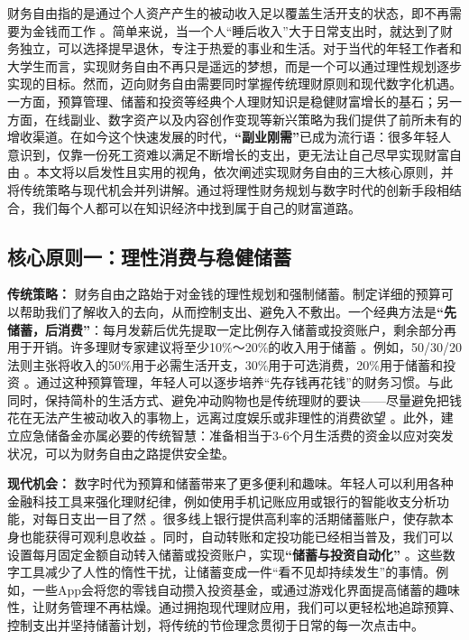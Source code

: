 \documentclass[
  12pt]{article}
\begin{document}
财务自由指的是通过个人资产产生的被动收入足以覆盖生活开支的状态，即不再需要为金钱而工作
\cite{ref1}。简单来说，当一个人``睡后收入''大于日常支出时，就达到了财务独立，可以选择提早退休，专注于热爱的事业和生活。对于当代的年轻工作者和大学生而言，实现财务自由不再只是遥远的梦想，而是一个可以通过理性规划逐步实现的目标。然而，迈向财务自由需要同时掌握传统理财原则和现代数字化机遇。一方面，预算管理、储蓄和投资等经典个人理财知识是稳健财富增长的基石；另一方面，在线副业、数字资产以及内容创作变现等新兴策略为我们提供了前所未有的增收渠道。在如今这个快速发展的时代，\textbf{``副业刚需''}已成为流行语：很多年轻人意识到，仅靠一份死工资难以满足不断增长的支出，更无法让自己尽早实现财富自由
\cite{ref2}。本文将以启发性且实用的视角，依次阐述实现财务自由的三大核心原则，并将传统策略与现代机会并列讲解。通过将理性财务规划与数字时代的创新手段相结合，我们每个人都可以在知识经济中找到属于自己的财富道路。

\hypertarget{ux6838ux5fc3ux539fux5219ux4e00ux7406ux6027ux6d88ux8d39ux4e0eux7a33ux5065ux50a8ux84c4}{%
\subsection{核心原则一：理性消费与稳健储蓄}\label{ux6838ux5fc3ux539fux5219ux4e00ux7406ux6027ux6d88ux8d39ux4e0eux7a33ux5065ux50a8ux84c4}}

\textbf{传统策略：}
财务自由之路始于对金钱的理性规划和强制储蓄。制定详细的预算可以帮助我们了解收入的去向，从而控制支出、避免入不敷出。一个经典方法是\textbf{``先储蓄，后消费''}：每月发薪后优先提取一定比例存入储蓄或投资账户，剩余部分再用于开销。许多理财专家建议将至少10\%～20\%的收入用于储蓄
\cite{ref3}。例如，50/30/20法则主张将收入的50\%用于必需生活开支，30\%用于可选消费，20\%用于储蓄和投资
\cite{ref4}。通过这种预算管理，年轻人可以逐步培养``先存钱再花钱''的财务习惯。与此同时，保持简朴的生活方式、避免冲动购物也是传统理财的要诀------尽量避免把钱花在无法产生被动收入的事物上，远离过度娱乐或非理性的消费欲望
\cite{ref1}。此外，建立应急储备金亦属必要的传统智慧：准备相当于3-6个月生活费的资金以应对突发状况，可以为财务自由之路提供安全垫。

\textbf{现代机会：}
数字时代为预算和储蓄带来了更多便利和趣味。年轻人可以利用各种金融科技工具来强化理财纪律，例如使用手机记账应用或银行的智能收支分析功能，对每日支出一目了然
\cite{ref1}。很多线上银行提供高利率的活期储蓄账户，使存款本身也能获得可观利息收益
\cite{ref1}。同时，自动转账和定投功能已经相当普及，我们可以设置每月固定金额自动转入储蓄或投资账户，实现\textbf{``储蓄与投资自动化''}
\cite{ref3}。这些数字工具减少了人性的惰性干扰，让储蓄变成一件``看不见却持续发生''的事情。例如，一些App会将您的零钱自动攒入投资基金，或通过游戏化界面提高储蓄的趣味性，让财务管理不再枯燥。通过拥抱现代理财应用，我们可以更轻松地追踪预算、控制支出并坚持储蓄计划，将传统的节俭理念贯彻于日常的每一次点击中。
\end{document}

